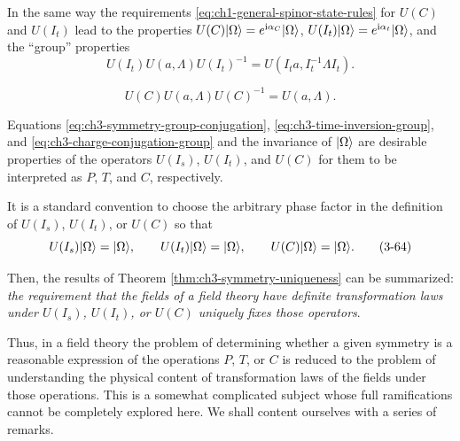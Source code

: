 In the same way the requirements \eqref{eq:ch1-general-spinor-state-rules} for $U(C)$ and $U(I_t)$ lead to the
properties $U(C)\lvert \Omega\rangle=e^{\mathrm{i}\alpha_C}\lvert \Omega\rangle$,
$U(I_t)\lvert \Omega\rangle=e^{\mathrm{i}\alpha_t}\lvert \Omega\rangle$, and the ``group''
properties
\begin{equation}
  U(I_t)U(a,\Lambda)U(I_t)^{-1}
  =U(I_ta,I_t^{-1}\Lambda I_t).
  \tag{3-62}\label{eq:ch3-time-inversion-group}
\end{equation}

\begin{equation}
  U(C)U(a,\Lambda)U(C)^{-1}=U(a,\Lambda).
  \tag{3-63}\label{eq:ch3-charge-conjugation-group}
\end{equation}

Equations \eqref{eq:ch3-symmetry-group-conjugation}, \eqref{eq:ch3-time-inversion-group}, and \eqref{eq:ch3-charge-conjugation-group} and the invariance of
$\lvert \Omega\rangle$ are desirable properties of the operators $U(I_s)$,
$U(I_t)$, and $U(C)$ for them to be interpreted as $P$, $T$, and $C$,
respectively.

It is a standard convention to choose the arbitrary phase factor in the
definition of $U(I_s)$, $U(I_t)$, or $U(C)$ so that
\begin{equation}
  U(I_s)\lvert \Omega\rangle=\lvert \Omega\rangle,\qquad
  U(I_t)\lvert \Omega\rangle=\lvert \Omega\rangle,\qquad
  U(C)\lvert \Omega\rangle=\lvert \Omega\rangle.
  \tag{3-64}\label{eq:ch3-inversion-vacuum-convention}
\end{equation}

Then, the results of Theorem \ref{thm:ch3-symmetry-uniqueness} can be summarized: \emph{the requirement
that the fields of a field theory have definite transformation laws under
$U(I_s)$, $U(I_t)$, or $U(C)$ uniquely fixes those operators}.

Thus, in a field theory the problem of determining whether a given symmetry
is a reasonable expression of the operations $P$, $T$, or $C$ is reduced to
the problem of understanding the physical content of transformation laws of
the fields under those operations.  This is a somewhat complicated subject
whose full ramifications cannot be completely explored here.  We shall
content ourselves with a series of remarks.


